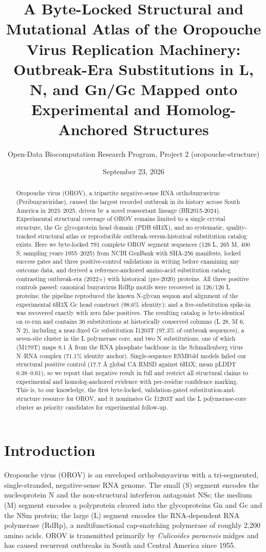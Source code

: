 \documentclass[12pt]{article}
\title{\textbf{A Byte-Locked Structural and Mutational Atlas of the Oropouche Virus Replication Machinery:\\Outbreak-Era Substitutions in L, N, and Gn/Gc Mapped onto Experimental and Homolog-Anchored Structures}}
\author{Open-Data Biocomputation Research Program, Project 2 (oropouche-structure)}
\date{September 23, 2026}
\begin{document}
\maketitle
\tableofcontents
\vspace{1em}
\begin{abstract}
Oropouche virus (OROV), a tripartite negative-sense RNA orthobunyavirus (Peribunyaviridae), caused the largest recorded outbreak in its history across South America in 2023--2025, driven by a novel reassortant lineage (BR2015-2024). Experimental structural coverage of OROV remains limited to a single crystal structure, the Gc glycoprotein head domain (PDB 6H3X), and no systematic, quality-tracked structural atlas or reproducible outbreak-versus-historical substitution catalog exists. Here we byte-locked 791 complete OROV segment sequences (126 L, 265 M, 400 S; sampling years 1955--2025) from NCBI GenBank with SHA-256 manifests, locked success gates and three positive-control validations in writing before examining any outcome data, and derived a reference-anchored amino-acid substitution catalog contrasting outbreak-era (2022+) with historical (pre-2020) proteins. All three positive controls passed: canonical bunyavirus RdRp motifs were recovered in 126/126 L proteins; the pipeline reproduced the known N-glycan sequon and alignment of the experimental 6H3X Gc head construct (98.6\% identity); and a five-substitution spike-in was recovered exactly with zero false positives. The resulting catalog is byte-identical on re-run and contains 36 substitutions at historically conserved columns (L 28, M 6, N 2), including a near-fixed Gc substitution I1203T (97.3\% of outbreak sequences), a seven-site cluster in the L polymerase core, and two N substitutions, one of which (M170T) maps 8.1 \AA{} from the RNA phosphate backbone in the Schmallenberg virus N--RNA complex (71.1\% identity anchor). Single-sequence ESMFold models failed our structural positive control (17.7 \AA{} global CA RMSD against 6H3X; mean pLDDT 0.38--0.61), so we report that negative result in full and restrict all structural claims to experimental and homolog-anchored evidence with per-residue confidence marking. This is, to our knowledge, the first byte-locked, validation-gated substitution-and-structure resource for OROV, and it nominates Gc I1203T and the L polymerase-core cluster as priority candidates for experimental follow-up.
\end{abstract}

\section{Introduction}
Oropouche virus (OROV) is an enveloped orthobunyavirus with a tri-segmented, single-stranded, negative-sense RNA genome. The small (S) segment encodes the nucleoprotein N and the non-structural interferon antagonist NSs; the medium (M) segment encodes a polyprotein cleaved into the glycoproteins Gn and Gc and the NSm protein; the large (L) segment encodes the RNA-dependent RNA polymerase (RdRp), a multifunctional cap-snatching polymerase of roughly 2,200 amino acids. OROV is transmitted primarily by \textit{Culicoides paraensis} midges and has caused recurrent outbreaks in South and Central America since 1955.
\end{document}

